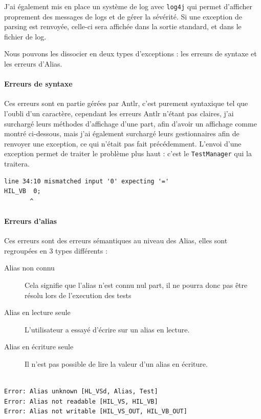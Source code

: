 J'ai également mis en place un système de log avec \texttt{log4j} qui permet d'afficher proprement des messages de logs et de gérer la sévérité. Si une exception de parsing est renvoyée, celle-ci sera affichée dans la sortie standard, et dans le fichier de log.

Nous pouvons les dissocier en deux types d'exceptions : les erreurs de syntaxe et les erreurs d'Alias. 
\paragraph{Erreurs de syntaxe} Ces erreurs sont en partie gérées par Antlr, c'est purement syntaxique tel que l'oubli d'un caractère, cependant les erreurs Antlr
n'étant pas claires, j'ai surchargé leurs méthodes d'affichage d'une part, afin d'avoir un affichage comme montré ci-dessous, mais j'ai également surchargé leurs gestionnaires afin de renvoyer une exception, ce qui n'était pas fait précédemment. L'envoi d'une exception permet de traiter le problème plus haut : c'est le \texttt{TestManager} qui la traitera.
\begin{lstlisting}[caption=Affichage d'une erreur de syntaxe, numbers=none]
line 34:10 mismatched input '0' expecting '='
HIL_VB  0;
       ^
\end{lstlisting}


\paragraph{Erreurs d'alias} Ces erreurs sont des erreurs sémantiques au niveau des Alias, elles sont regroupées en 3 types différents : 
\begin{description}
	\item[Alias non connu] Cela signifie que l'alias n'est connu nul part, il ne pourra donc pas être résolu lors de l'execution des tests
	\item[Alias en lecture seule] L'utilisateur a essayé d'écrire sur un alias en lecture.
	\item[Alias en écriture seule] Il n'est pas possible de lire la valeur d'un alias en écriture.\\~
\end{description}

\begin{lstlisting}[caption=Affichage d'une erreur d'alias, numbers=none]
Error: Alias unknown [HL_VSd, Alias, Test]
Error: Alias not readable [HIL_VS, HIL_VB]
Error: Alias not writable [HIL_VS_OUT, HIL_VB_OUT]
\end{lstlisting}

